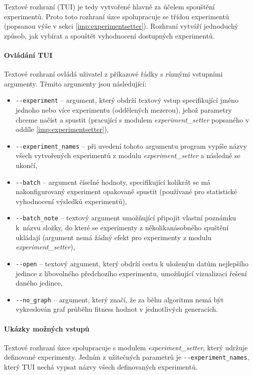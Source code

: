 Textové rozhraní (TUI) je tedy vytvořené hlavně za účelem spouštění
experimentů. Proto toto rozhraní úzce spolupracuje se třídou experimentů
(popsanou výše v sekci \ref{imp:experimentsetter}). Rozhraní vytváří jednoduchý
způsob, jak vybírat a spouštět vyhodnocení dostupných experimentů.

\paragraph{Ovládání TUI}
Textové rozhraní ovládá uživatel z příkazové řádky s různými vstupními
argumenty. Těmito argumenty jsou následující:

\begin{itemize}
    \item \texttt{-{}-experiment} -- argument, který obdrží textový vstup
        specifikující jméno jednoho nebo více experimentu (oddělených mezerou),
        jehož parametry chceme načíst a spustit (pracující s modulem
        \emph{experiment\_setter} popsaného v oddíle
        \ref{imp:experimentsetter}),
    \item \texttt{-{}-experiment\_names} -- při uvedení tohoto argumentu
        program vypíše názvy všech vytvořených experimentů z modulu
        \emph{experiment\_setter} a následně se ukončí,
    \item \texttt{-{}-batch} -- argument číselné hodnoty, specifikující
        kolikrát se má nakonfigurovaný experiment opakovaně spustit (používané
        pro statistické vyhodnocení výsledků experimentů),
    \item \texttt{-{}-batch\_note} -- textový argument umožňující připojit
        vlastní poznámku k~názvu složky, do které se experimenty z
        několikanásobného spuštění ukládají (argument nemá žádný efekt pro
        experimenty z modulu \\\emph{experiment\_setter}),
    \item \texttt{-{}-open} -- textový argument, který obdrží cestu k uloženým
        datům nejlepšího jedince z libovolného předchozího experimentu,
        umožňující vizualizaci řešení daného jedince,
    \item \texttt{-{}-no\_graph} -- argument, který značí, že za běhu algoritmu
        nemá být vykreslován graf průběhu fitness hodnot v jednotlivých
        generacích.
\end{itemize}

\paragraph{Ukázky možných vstupů}
Textové rozhraní úzce spolupracuje s modulem \emph{experiment\_setter}, který
udržuje definované experimenty. Jedním z užitečných parametrů je
\texttt{-{}-experiment\_names}, který TUI nechá vypsat názvy všech definovaných
experimentů.

